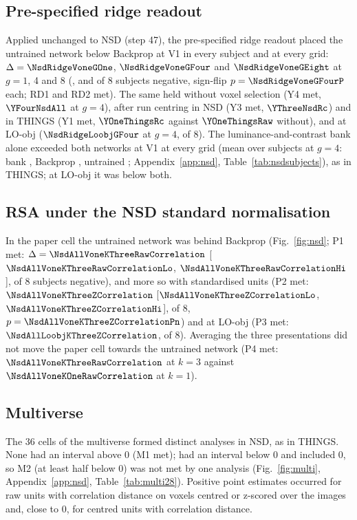 \subsection{Pre-specified ridge readout}
\label{sec:nsdridge}
Applied unchanged to NSD (step 47), the pre-specified ridge readout placed the untrained network below
Backprop at V1 in every subject and at every grid: $\Delta = \NsdRidgeVoneGOne$, $\NsdRidgeVoneGFour$ and
$\NsdRidgeVoneGEight$ at $g = 1$, 4 and 8 (\NsdRidgeVoneGOneNeg, \NsdRidgeVoneGFourNeg{} and
\NsdRidgeVoneGEightNeg{} of 8 subjects negative, sign-flip $p = \NsdRidgeVoneGFourP$ each; RD1 and RD2
met). The same held without voxel selection (Y4 met, $\YFourNsdAll$ at $g = 4$), after run centring in NSD
(Y3 met, $\YThreeNsdRc$) and in THINGS (Y1 met, $\YOneThingsRc$ against $\YOneThingsRaw$ without), and at
LO-obj ($\NsdRidgeLoobjGFour$ at $g = 4$, \NsdRidgeLoobjGFourNeg{} of 8). The luminance-and-contrast bank
alone exceeded both networks at V1 at every grid (mean over subjects at $g = 4$: bank
\NsdRidgeVoneGFourBank, Backprop \NsdRidgeVoneGFourBp, untrained \NsdRidgeVoneGFourRand;
Appendix~\ref{app:nsd}, Table~\ref{tab:nsdsubjects}), as in THINGS; at LO-obj it was below both.

\subsection{RSA under the NSD standard normalisation}
\label{sec:nsdrsa}
In the paper cell the untrained network was behind Backprop (Fig.~\ref{fig:nsd}; P1 met: $\Delta = \NsdAllVoneKThreeRawCorrelation$
[$\NsdAllVoneKThreeRawCorrelationLo$, $\NsdAllVoneKThreeRawCorrelationHi$], \NsdAllVoneKThreeRawCorrelationNeg{}
of 8 subjects negative), and more so with standardised units (P2 met: $\NsdAllVoneKThreeZCorrelation$
[$\NsdAllVoneKThreeZCorrelationLo$, $\NsdAllVoneKThreeZCorrelationHi$], \NsdAllVoneKThreeZCorrelationNeg{} of 8,
$p = \NsdAllVoneKThreeZCorrelationPn$) and at LO-obj (P3 met: $\NsdAllLoobjKThreeZCorrelation$,
\NsdAllLoobjKThreeZCorrelationNeg{} of 8). Averaging the three presentations did not move the paper cell
towards the untrained network (P4 met: $\NsdAllVoneKThreeRawCorrelation$ at $k = 3$ against
$\NsdAllVoneKOneRawCorrelation$ at $k = 1$).

\subsection{Multiverse}
\label{sec:nsdmultiverse}
The 36 cells of the multiverse formed \MvNsessionDistinct{} distinct analyses in NSD, as in THINGS. None
had an interval above 0 (M1 met); \MvNsessionBelow{} had an interval below 0 and \MvNsessionIncl{}
included 0, so M2 (at least half below 0) was not met by one analysis
(Fig.~\ref{fig:multi}, Appendix~\ref{app:nsd}, Table~\ref{tab:multi28}). Positive point estimates
occurred for raw units with correlation distance on voxels centred or z-scored over the images and, close
to 0, for centred units with correlation distance.

